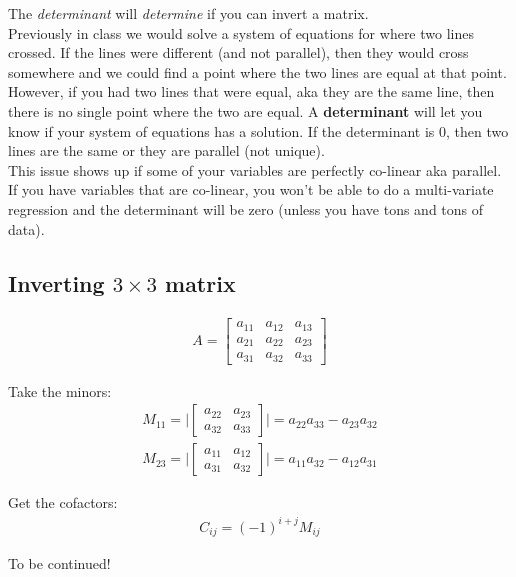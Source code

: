 \documentclass{article}
\begin{document}
The \textit{determinant} will \textit{determine} if you can invert a matrix. \\

Previously in class we would solve a system of equations for where two lines crossed. If the lines were different (and not parallel), then they would cross somewhere and we could find a point where the two lines are equal at that point. However, if you had two lines that were equal, aka they are the same line, then there is no single point where the two are equal. A \textbf{determinant} will let you know if your system of equations has a solution. If the determinant is 0, then two lines are the same or they are parallel (not unique). \\

This issue shows up if some of your variables are perfectly co-linear aka parallel. If you have variables that are co-linear, you won't be able to do a multi-variate regression and the determinant will be zero (unless you have tons and tons of data). 


\subsection{Inverting $3 \times 3$ matrix}

\begin{align}
    A = \begin{bmatrix}
                a_{11} & a_{12} & a_{13} \\
                a_{21} & a_{22} & a_{23} \\
                a_{31} & a_{32} & a_{33}
    \end{bmatrix}
\end{align}

Take the minors: 
\begin{align}
    M_{11} = \Bigg| \begin{bmatrix}
                    a_{22} & a_{23} \\
                    a_{32} & a_{33}
    \end{bmatrix} \Bigg| = a_{22}a_{33} - a_{23} a_{32} \\
    M_{23} = \Bigg| \begin{bmatrix}
                    a_{11} & a_{12} \\
                    a_{31} & a_{32}
    \end{bmatrix} \Bigg|   = a_{11} a_{32} - a_{12} a_{31}
\end{align}

Get the cofactors: 
\begin{align}
    C_{ij} = (-1)^{i + j} M_{ij}
\end{align}

To be continued! 
\end{document}
